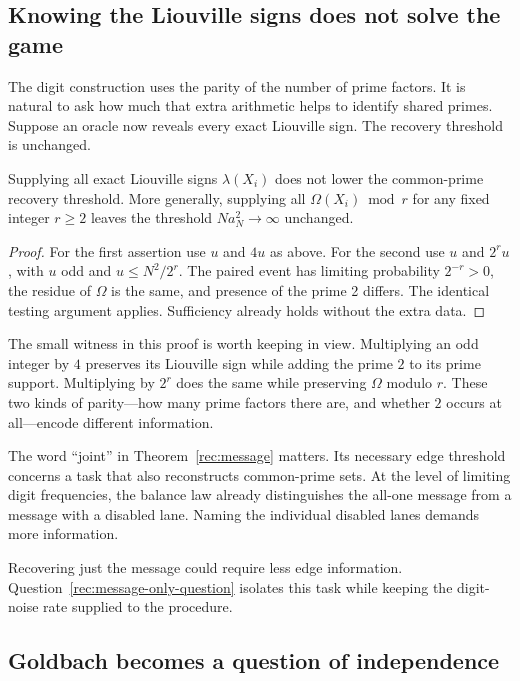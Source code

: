 \subsection{Knowing the Liouville signs does not solve the game}

The digit construction uses the parity of the number of prime factors.
It is natural to ask how much that extra arithmetic helps to identify
shared primes. Suppose an oracle now reveals every exact Liouville
sign. The recovery threshold is unchanged.

\begin{corollary}\label{rec:liouville-oracle}
Supplying all exact Liouville signs $\lambda(X_i)$ does not lower
the common-prime recovery threshold. More generally, supplying all
$\Omega(X_i)\bmod r$ for any fixed integer $r\ge2$ leaves the
threshold $Na_N^2\to\infty$ unchanged.
\end{corollary}
\begin{proof}
For the first assertion use $u$ and $4u$ as above. For the second use
$u$ and $2^ru$, with $u$ odd and $u\le N^2/2^r$. The paired event
has limiting probability $2^{-r}>0$, the residue of $\Omega$ is the
same, and presence of the prime 2 differs. The identical testing
argument applies. Sufficiency already holds without the extra data.
\end{proof}

The small witness in this proof is worth keeping in view. Multiplying
an odd integer by $4$ preserves its Liouville sign while adding the
prime $2$ to its prime support. Multiplying by $2^r$ does the same while
preserving $\Omega$ modulo $r$. These two kinds of parity---how many
prime factors there are, and whether $2$ occurs at all---encode different
information.

The word ``joint'' in Theorem~\ref{rec:message} matters. Its necessary
edge threshold concerns a task that also reconstructs common-prime
sets. At the level of limiting digit frequencies, the balance law
already distinguishes the all-one message from a message with a
disabled lane. Naming the individual disabled lanes demands more
information.

Recovering just the message could require less edge information.
Question~\ref{rec:message-only-question} isolates this task while
keeping the digit-noise rate supplied to the procedure.

\subsection{Goldbach becomes a question of independence}

